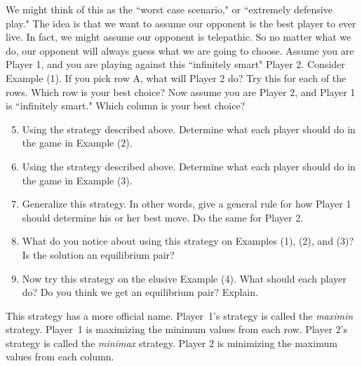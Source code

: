 We might think of this as the ``worst case scenario," or ``extremely defensive play." The idea is that we want to assume our opponent is the best player to ever live. In fact, we might assume our opponent is telepathic. So no matter what we do, our opponent will always guess what we are going to choose. Assume you are Player 1, and you are playing against this ``infinitely smart" Player 2. Consider Example (1). If you pick row A, what will Player 2 do? Try this for each of the rows. Which row is your best choice? Now assume you are Player 2, and Player 1 is ``infinitely smart." Which column is your best choice?

\vspace{.1in}

\begin{enumerate}
\setcounter{enumi}{4}
\item Using the strategy described above. Determine what each player should do in the game in Example (2).

\vspace{.08in}

\item Using the strategy described above. Determine what each player should do in the game in Example (3).

\vspace{.08in}


\item Generalize this strategy. In other words, give a general rule for how Player 1 should determine his or her best move. Do the same for Player 2.

\vspace{.08in}


\item What do you notice about using this strategy on Examples (1), (2), and (3)? Is the solution an equilibrium pair?

\vspace{.08in}


\item Now try this strategy on the elusive Example (4). What should each player do? Do you think we get an equilibrium pair? Explain.

\end{enumerate}

 This strategy has a more official name. Player~1's strategy is called the {\it maximin} strategy. Player~1 is maximizing the minimum values from each row. Player 2's strategy is called the {\it minimax} strategy. Player 2 is minimizing the maximum values from each column. 


